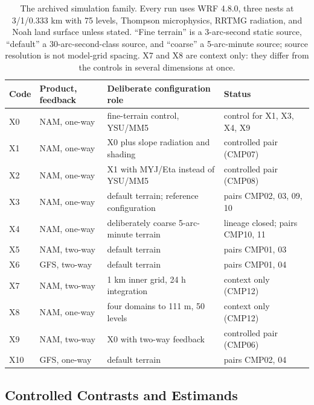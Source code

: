 \documentclass[air,article,submit,moreauthors]{Definitions/mdpi}
\begin{document}
\begin{table}[H]
\caption{The archived simulation family.
Every run uses WRF 4.8.0, three nests at 3/1/0.333 km with 75 levels, Thompson microphysics, RRTMG radiation, and Noah land surface unless stated.
``Fine terrain'' is a 3-arc-second static source, ``default'' a 30-arc-second-class source, and ``coarse'' a 5-arc-minute source; source resolution is not model-grid spacing.
X7 and X8 are context only: they differ from the controls in several dimensions at once.}
\label{tab:v3-family}
\centering
\small
\begin{tabularx}{\textwidth}{llLL}
\toprule
Code & Product, feedback & Deliberate configuration role & Status \\
\midrule
X0  & NAM, one-way & fine-terrain control, YSU/MM5 & control for X1, X3, X4, X9 \\
X1  & NAM, one-way & X0 plus slope radiation and shading & controlled pair (CMP07) \\
X2  & NAM, one-way & X1 with MYJ/Eta instead of YSU/MM5 & controlled pair (CMP08) \\
X3  & NAM, one-way & default terrain; reference configuration & pairs CMP02, 03, 09, 10 \\
X4  & NAM, one-way & deliberately coarse 5-arc-minute terrain & lineage closed; pairs CMP10, 11 \\
X5  & NAM, two-way & default terrain & pairs CMP01, 03 \\
X6  & GFS, two-way & default terrain & pairs CMP01, 04 \\
X7  & NAM, two-way & 1 km inner grid, 24 h integration & context only (CMP12) \\
X8  & NAM, one-way & four domains to 111 m, 50 levels & context only (CMP12) \\
X9  & NAM, two-way & X0 with two-way feedback & controlled pair (CMP06) \\
X10 & GFS, one-way & default terrain & pairs CMP02, 04 \\
\bottomrule
\end{tabularx}
\end{table}

\subsection{Controlled Contrasts and Estimands}
\end{document}
